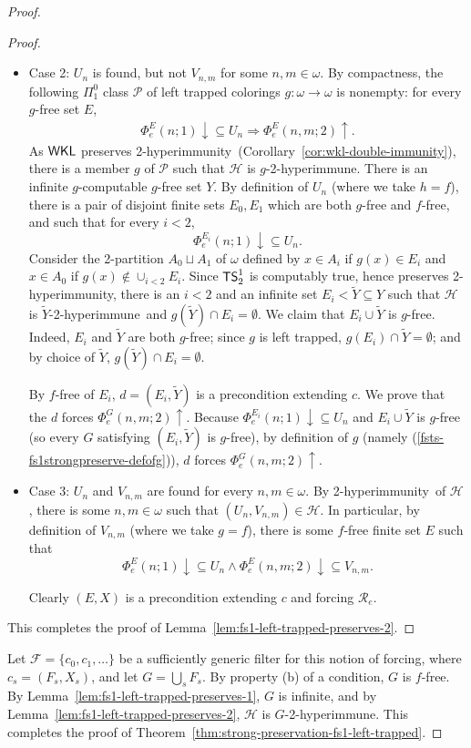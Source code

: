 \documentclass{amsart}
\theoremstyle{definition}
\theoremstyle{remark}
\numberwithin{equation}{section}
\theoremstyle{noparens}
\def\t{\tilde}
\def\propertyL{2-hyperimmunity}
\def\hyper{2-hyperimmune}
\newcommand{\Fcal}{\mathcal{F}}
\newcommand{\Hcal}{\mathcal{H}}
\newcommand{\Pcal}{\mathcal{P}}
\newcommand{\Rcal}{\mathcal{R}}
\newcommand{\s}[1]{\ensuremath{\sf{#1}}}
\DeclareMathOperator{\wkl}{\s{WKL}}
\DeclareMathOperator{\ts}{\s{TS}}
\begin{document}
\begin{proof}
\begin{proof}
\begin{itemize}
	\item Case 2: $U_n$ is found, but not $V_{n,m}$ for some $n, m \in \omega$. By compactness,
	the following $\Pi^{0}_1$ class $\Pcal$ of left trapped colorings $g : \omega \to \omega$
is nonempty:
	 for every $g$-free set $E$,
	\begin{align}\label{fsts-fs1strongpreserve-defofg}
	\Phi_e^{ E}(n;1) \downarrow \subseteq U_n
		\Rightarrow \Phi_e^{ E}(n, m;2) \uparrow.
	\end{align}
	As $\wkl$ preserves \propertyL\
	(Corollary~\ref{cor:wkl-double-immunity}), there is a member $g$
	of $\Pcal$ such that $\Hcal$ is $g$-\hyper.
	There is an infinite  $g$-computable
 $g$-free set $Y$.
	By definition of $U_n$ (where we take $h = f$),
	there is a pair of disjoint finite sets $E_0, E_1 $
	which are both $g$-free and $f$-free, and such that for every $i < 2$,
	$$
	\Phi_e^{E_i}(n;1) \downarrow \subseteq U_n.
	$$
Consider the 2-partition $A_0\sqcup A_1$ of $\omega$
defined by $x\in A_i$ if $g(x)\in E_i$ and $x\in A_0$ if $g(x)\notin \cup_{i<2}E_i$.	
 Since  $\ts^1_2$ is computably true, hence preserves \propertyL,
	there is an $i < 2$ and an infinite set $E_i<\t Y \subseteq Y$ such that $\Hcal$
	is $\t Y $-\hyper\ and $g(\t Y)\cap E_i=\emptyset$.
We claim that $E_i \cup \t Y$ is $g$-free.
	Indeed, $E_i$ and $\t Y$ are both $g$-free; since $g$ is left trapped,
	$g(E_i) \cap \t Y = \emptyset$; and by choice of $\t Y$,
$g(\t Y) \cap E_i = \emptyset$.

		By $f$-free of $E_i$, $d=(E_i, \t Y  )$ is a precondition extending $c$.
We prove that the   $d$ forces $\Phi_e^{  G}(n,m;2) \uparrow$.
Because   $\Phi_e^{E_i}(n;1)\downarrow\subseteq U_n$ and
$E_i \cup \t Y$ is $g$-free
(so every $G$ satisfying $(E_i,\t Y)$ is $g$-free), by definition of $g$ (namely (\ref{fsts-fs1strongpreserve-defofg})), $d$ forces $\Phi_e^{ G}(n, m;2) \uparrow$.

	
	\bigskip

	\item Case 3: $U_n$ and $V_{n,m}$ are found for every $n,m \in \omega$.
	By  \propertyL\ of $\Hcal$, there is some $n, m \in \omega$
	such that $(U_n, V_{n,m}) \in \Hcal$.
	In particular, by definition of $V_{n,m}$ (where we take $g = f$),
	there is some $f$-free finite set $E $ such that
	$$
	\Phi_e^{E}(n;1) \downarrow \subseteq U_n
		\wedge \Phi_e^{E}(n, m;2) \downarrow \subseteq V_{n,m}.
	$$
	
		Clearly $(E, X)$ is a  precondition
extending $c$ and forcing $\Rcal_e$.
\end{itemize}
This completes the proof of Lemma~\ref{lem:fs1-left-trapped-preserves-2}.
\end{proof}

Let $\Fcal = \{c_0, c_1, \dots \}$ be a sufficiently generic filter for this notion of forcing,
where $c_s = (F_s, X_s)$, and let $G = \bigcup_s F_s$.
By property (b) of a condition, $G$ is $f$-free.
By Lemma~\ref{lem:fs1-left-trapped-preserves-1}, $G$ is infinite,
and by Lemma~\ref{lem:fs1-left-trapped-preserves-2},
$\Hcal$ is $  G$-\hyper.
This completes the proof of Theorem~\ref{thm:strong-preservation-fs1-left-trapped}.
\end{proof}
\end{document}

